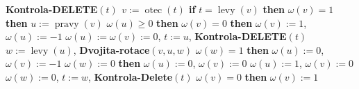 \documentclass[a4paper,12pt]{article}
\DeclareMathOperator*{\otec}{otec}
\DeclareMathOperator*{\levy}{levy}
\DeclareMathOperator*{\pravy}{pravy}
\begin{document}
{\bf Kontrola-DELETE$(t)$\newline 
$v:=\otec(t)$\newline 
if} $t=\levy(v)$ {\bf then}\newline 
\phantom{---}{\bf if} $\omega (v)=1$ {\bf then}\newline 
\phantom{------}$u:=\pravy(v)$\newline 
\phantom{------}{\bf if} $\omega (u)\ge 0$ {\bf then}\newline 
\phantom{---------}{\bf Rotace$(v,u)$}\newline 
\phantom{---------}{\bf if} $\omega (v)=0$ {\bf then}\newline 
\phantom{------------}$\omega (v):=1$, $\omega (u):=-1$\newline 
\phantom{---------}{\bf else}\newline 
\phantom{------------}$\omega (u):=\omega (v):=0$, $t:=u$, {\bf Kontrola-DELETE}$(t)$\newline 
\phantom{---------}{\bf endif}\newline 
\phantom{------}{\bf else}\newline 
\phantom{---------}$w:=\levy(u)$, {\bf Dvojita-rotace}$(v,u,w)$\newline 
\phantom{---------}{\bf if} $\omega (w)=1$ {\bf then}\newline 
\phantom{------------}$\omega (u):=0$, $\omega (v):=-1$\newline 
\phantom{---------}{\bf else}\newline 
\phantom{------------}{\bf if} $\omega (w):=0$ {\bf then}\newline 
\phantom{---------------}$\omega (u):=0$, $\omega(v):=0$\newline 
\phantom{------------}{\bf else}\newline 
\phantom{---------------}$\omega (u):=1$, $\omega (v):=0$\newline 
\phantom{------------}{\bf endif}\newline 
\phantom{---------}{\bf endif}\newline 
\phantom{---------}$\omega (w):=0$, $t:=w$, {\bf Kontrola-Delete}$(t)$\newline 
\phantom{------}{\bf endif}\newline 
\phantom{---}{\bf endif\newline 
else}\newline 
\phantom{---}{\bf if} $\omega (v)=0$ {\bf then}\newline 
\phantom{------}$\omega (v):=1$\newline 
\end{document}
